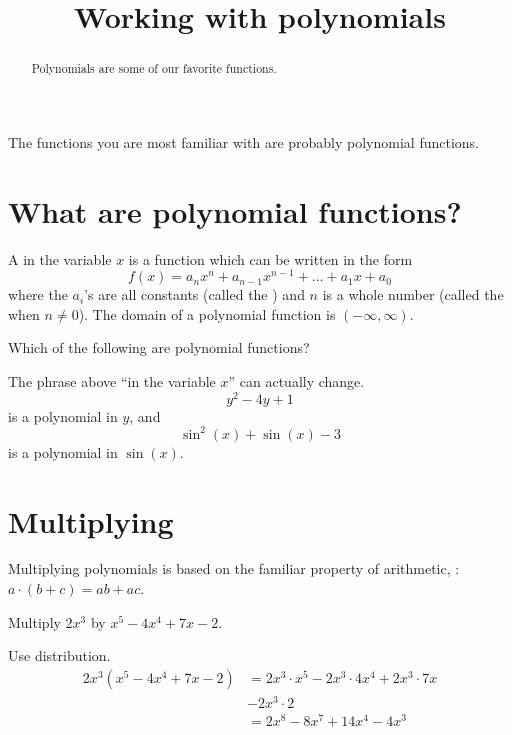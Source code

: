 \documentclass{ximera}
\title[Dig-In:]{Working with polynomials}
\begin{document}
\begin{abstract}
  Polynomials are some of our favorite functions. 
\end{abstract}
\maketitle


The functions you are most familiar with are probably polynomial
functions.

\section{What are polynomial functions?}

\begin{definition}
  A  in the variable $x$ is a function
  which can be written in the form
  \[
  f(x) = a_nx^n + a_{n-1}x^{n-1} + \dots + a_1 x + a_0
  \]
  where the $a_i$'s are all constants (called the )
  and $n$ is a whole number (called the  when $n\ne
  0$). The domain of a polynomial function is $(-\infty,\infty)$.
\end{definition}

\begin{question}
  Which of the following are polynomial functions?
  \begin{selectAll}
  \end{selectAll}
\end{question}

The phrase above ``in the variable $x$'' can actually change.
\[
y^2-4y +1
\]
is a polynomial in $y$, and
\[
\sin^2(x) + \sin(x) -3 
\]
is a polynomial in $\sin(x)$.


\section{Multiplying}

Multiplying polynomials is based on the familiar property of arithmetic, : $\displaystyle a\cdot( b + c ) = ab + ac$.
\begin{example}
	Multiply $2x^3$ by $x^5 - 4x^4 + 7x - 2$.
	\begin{explanation}
		Use distribution.
		\begin{align*}
			2x^3 \left( x^5 - 4x^4 + 7x - 2 \right) &= 2x^3 \cdot x^5 - 2x^3 \cdot 4x^4 + 2x^3 \cdot 7x \\
				& - 2x^3 \cdot 2\\
				&= 2 x^8 - 8x^7 + 14x^4 - 4x^3
		\end{align*}
	\end{explanation}
\end{example}
\end{document}
